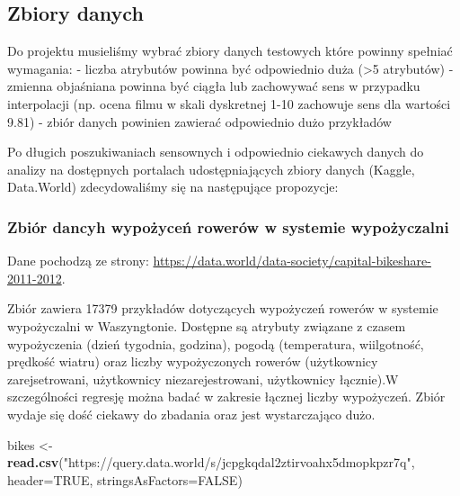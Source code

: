\documentclass[
]{article}
\newenvironment{Shaded}{\begin{snugshade}}{\end{snugshade}}
\newcommand{\DataTypeTok}[1]{\textcolor[rgb]{0.13,0.29,0.53}{#1}}
\newcommand{\KeywordTok}[1]{\textcolor[rgb]{0.13,0.29,0.53}{\textbf{#1}}}
\newcommand{\NormalTok}[1]{#1}
\newcommand{\OperatorTok}[1]{\textcolor[rgb]{0.81,0.36,0.00}{\textbf{#1}}}
\newcommand{\OtherTok}[1]{\textcolor[rgb]{0.56,0.35,0.01}{#1}}
\newcommand{\StringTok}[1]{\textcolor[rgb]{0.31,0.60,0.02}{#1}}
\begin{document}
\hypertarget{zbiory-danych}{%
\subsection{Zbiory danych}\label{zbiory-danych}}

Do projektu musieliśmy wybrać zbiory danych testowych które powinny
spełniać wymagania: - liczba atrybutów powinna być odpowiednio duża
(\textgreater5 atrybutów) - zmienna objaśniana powinna być ciągła lub
zachowywać sens w przypadku interpolacji (np. ocena filmu w skali
dyskretnej 1-10 zachowuje sens dla wartości 9.81) - zbiór danych
powinien zawierać odpowiednio dużo przykładów

Po długich poszukiwaniach sensownych i odpowiednio ciekawych danych do
analizy na dostępnych portalach udostępniających zbiory danych (Kaggle,
Data.World) zdecydowaliśmy się na następujące propozycje:

\hypertarget{zbiuxf3r-dancyh-wypoux17cyceux144-roweruxf3w-w-systemie-wypoux17cyczalni}{%
\subsubsection{Zbiór dancyh wypożyceń rowerów w systemie
wypożyczalni}\label{zbiuxf3r-dancyh-wypoux17cyceux144-roweruxf3w-w-systemie-wypoux17cyczalni}}

Dane pochodzą ze strony:
\href{}{https://data.world/data-society/capital-bikeshare-2011-2012}.

Zbiór zawiera 17379 przykładów dotyczących wypożyczeń rowerów w systemie
wypożyczalni w Waszyngtonie. Dostępne są atrybuty związane z czasem
wypożyczenia (dzień tygodnia, godzina), pogodą (temperatura,
wiilgotność, prędkość wiatru) oraz liczby wypożyczonych rowerów
(użytkownicy zarejsetrowani, użytkownicy niezarejestrowani, użytkownicy
łącznie).W szczególności regresję można badać w zakresie łącznej liczby
wypożyczeń. Zbiór wydaje się dość ciekawy do zbadania oraz jest
wystarczająco dużo.

\begin{Shaded}
\begin{Highlighting}[]
\NormalTok{bikes <-}\StringTok{ }\KeywordTok{read.csv}\NormalTok{(}\StringTok{"https://query.data.world/s/jcpgkqdal2ztirvoahx5dmopkpzr7q"}\NormalTok{, }\DataTypeTok{header=}\OtherTok{TRUE}\NormalTok{, }\DataTypeTok{stringsAsFactors=}\OtherTok{FALSE}\NormalTok{)}
\end{Highlighting}
\end{Shaded}

\begin{Shaded}
\end{Shaded}
\end{document}
